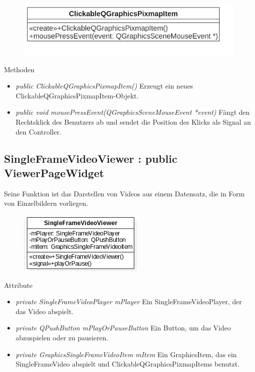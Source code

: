 \begin{figure}[H]
	\centering
	\includegraphics[scale=0.5]{img/Klassendiagramm/Klassen/View/ClickableQGraphicsPixmapItem}
	\label{fig:clickableQGraphicsPixmapItem}
\end{figure}

Methoden
\begin{itemize}
	\item\textit{public ClickableQGraphicsPixmapItem()} 
	Erzeugt ein neues ClickableQGraphicsPixmapItem-Objekt.
	\item\textit{public void mousePressEvent(QGraphicsSceneMouseEvent *event)} 
	Fängt den Rechtsklick des Benutzers ab und sendet die Position des Klicks als Signal an den Controller.
\end{itemize}

\subsection*{SingleFrameVideoViewer : public ViewerPageWidget}
Seine Funktion ist das Darstellen von Videos aus einem Datensatz, die in Form von Einzelbildern vorliegen.

\begin{figure}[H]
	\centering
	\includegraphics[scale=0.5]{img/Klassendiagramm/Klassen/View/SingleFrameVideoViewer}
	\label{fig:singleFrameVideoViewer}
\end{figure}

Attribute
\begin{itemize}
	\item\textit{private SingleFrameVideoPlayer mPlayer} 
	Ein SingleFrameVideoPlayer, der das Video abspielt. 
	\item\textit{private QPushButton mPlayOrPauseButton} 
	Ein Button, um das Video abzuspielen oder zu pausieren.
	\item\textit{private GraphicsSingleFrameVideoItem mItem} 
	Ein GraphicsItem, das ein SingleFrameVideo abspielt und ClickableQGraphicsPixmapItems benutzt.
\end{itemize}

